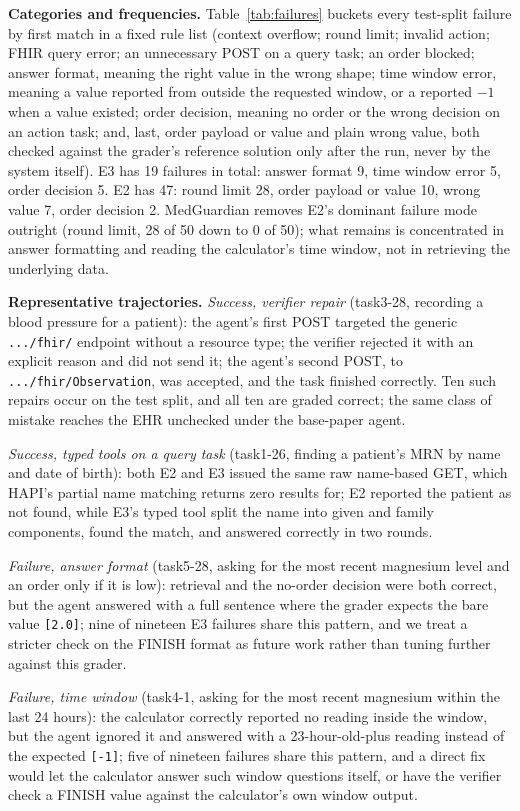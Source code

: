 \documentclass[conference]{IEEEtran}
\begin{document}
\textbf{Categories and frequencies.} Table~\ref{tab:failures} buckets every test-split failure by first match in a fixed rule list (context overflow; round limit; invalid action; FHIR query error; an unnecessary POST on a query task; an order blocked; answer format, meaning the right value in the wrong shape; time window error, meaning a value reported from outside the requested window, or a reported $-1$ when a value existed; order decision, meaning no order or the wrong decision on an action task; and, last, order payload or value and plain wrong value, both checked against the grader's reference solution only after the run, never by the system itself). E3 has 19 failures in total: answer format 9, time window error 5, order decision 5. E2 has 47: round limit 28, order payload or value 10, wrong value 7, order decision 2. MedGuardian removes E2's dominant failure mode outright (round limit, 28 of 50 down to 0 of 50); what remains is concentrated in answer formatting and reading the calculator's time window, not in retrieving the underlying data.

\textbf{Representative trajectories.} \emph{Success, verifier repair} (task3-28, recording a blood pressure for a patient): the agent's first POST targeted the generic \texttt{.../fhir/} endpoint without a resource type; the verifier rejected it with an explicit reason and did not send it; the agent's second POST, to \texttt{.../fhir/Observation}, was accepted, and the task finished correctly. Ten such repairs occur on the test split, and all ten are graded correct; the same class of mistake reaches the EHR unchecked under the base-paper agent.

\emph{Success, typed tools on a query task} (task1-26, finding a patient's MRN by name and date of birth): both E2 and E3 issued the same raw name-based GET, which HAPI's partial name matching returns zero results for; E2 reported the patient as not found, while E3's typed tool split the name into given and family components, found the match, and answered correctly in two rounds.

\emph{Failure, answer format} (task5-28, asking for the most recent magnesium level and an order only if it is low): retrieval and the no-order decision were both correct, but the agent answered with a full sentence where the grader expects the bare value \texttt{[2.0]}; nine of nineteen E3 failures share this pattern, and we treat a stricter check on the FINISH format as future work rather than tuning further against this grader.

\emph{Failure, time window} (task4-1, asking for the most recent magnesium within the last 24 hours): the calculator correctly reported no reading inside the window, but the agent ignored it and answered with a 23-hour-old-plus reading instead of the expected \texttt{[-1]}; five of nineteen failures share this pattern, and a direct fix would let the calculator answer such window questions itself, or have the verifier check a FINISH value against the calculator's own window output.
\end{document}

